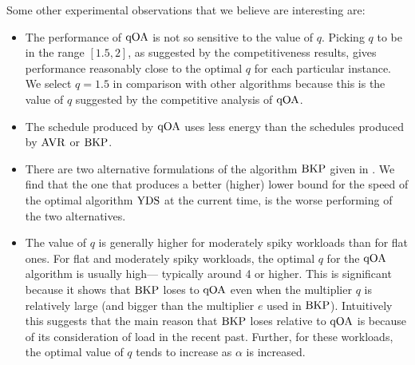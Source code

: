 \documentclass[11pt]{article}
\newcommand{\YDS}{{\rm YDS}}
\newcommand{\BKP}{{\rm BKP}}
\newcommand{\AVR}{{\rm AVR}}
\newcommand{\qOA}{{\rm qOA}}
\newcommand{\mycomment}[1]{ }
\begin{document}
Some other experimental observations that we believe are interesting are:
\begin{itemize}

\item 
The performance of $\qOA$ is not so sensitive to the value
of $q$. Picking $q$ to be in the range $[1.5, 2]$, as suggested
by the competitiveness results, gives performance reasonably close to the optimal $q$
for each particular instance.
We select $q=1.5$ in comparison with other algorithms because this is the
value of $q$ suggested by the competitive analysis of $\qOA$.

\item The schedule produced by $\qOA$  uses
less energy than the schedules produced by $\AVR$ or $\BKP$.


\item 
There are two alternative formulations of the algorithm $\BKP$ given
in \cite{BKP}. We find that the one that produces a better (higher) lower bound for
the speed of the optimal algorithm $\YDS$ at the current time, is the worse performing
of the two alternatives.

\item 
The value of $q$ is generally higher for moderately spiky workloads than for flat
ones.  
For flat and moderately spiky workloads, the optimal $q$ for the $\qOA$ algorithm is
usually high--- typically around 4 or higher.
This is significant because it shows that $\BKP$ loses to $\qOA$ even when the multiplier $q$ is relatively
large (and bigger than the multiplier $e$ used in $\BKP$). Intuitively this suggests that the main
reason that $\BKP$ loses relative to $\qOA$ is because of its consideration of load in the recent past.
Further, for these workloads, the optimal value of $q$ tends to increase as $\alpha$ is increased. 

\mycomment{
\item As $\alpha$ is increased, optimal $q$ of $\qOA$ usually increases
  for flat and moderately spiky workloads. Optimal $q$ is usually high
  - around 3 or higher - for both types of workload, and hence it is
  logical that optimal $q$ does not go down, because using a smaller
  $q$ means that jobs preceding a spike would run slower, thus taking
  longer and forcing later jobs - which constitute a spike - to run
  much faster to be able to meet their deadlines, which consequently
  cause the workload to consume more energy. However, it is probably
  beneficial to increase $q$ to allow the jobs preceding a spike to
  finish faster, thus giving more room, i.e. a longer time span, for
  later jobs to complete, and therefore enabling them to run at lower
  speeds; which can result in overall less energy consumption.
}


\end{itemize}
\end{document}
